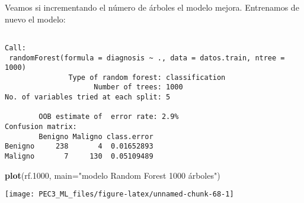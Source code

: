\documentclass[
]{article}
\newenvironment{Shaded}{\begin{snugshade}}{\end{snugshade}}
\newcommand{\DataTypeTok}[1]{\textcolor[rgb]{0.13,0.29,0.53}{#1}}
\newcommand{\DecValTok}[1]{\textcolor[rgb]{0.00,0.00,0.81}{#1}}
\newcommand{\FloatTok}[1]{\textcolor[rgb]{0.00,0.00,0.81}{#1}}
\newcommand{\KeywordTok}[1]{\textcolor[rgb]{0.13,0.29,0.53}{\textbf{#1}}}
\newcommand{\NormalTok}[1]{#1}
\newcommand{\OperatorTok}[1]{\textcolor[rgb]{0.81,0.36,0.00}{\textbf{#1}}}
\newcommand{\StringTok}[1]{\textcolor[rgb]{0.31,0.60,0.02}{#1}}
\begin{document}
Veamos si incrementando el número de árboles el modelo mejora.
Entrenamos de nuevo el modelo:

\begin{Shaded}
\end{Shaded}

\begin{verbatim}

Call:
 randomForest(formula = diagnosis ~ ., data = datos.train, ntree = 1000) 
               Type of random forest: classification
                     Number of trees: 1000
No. of variables tried at each split: 5

        OOB estimate of  error rate: 2.9%
Confusion matrix:
        Benigno Maligno class.error
Benigno     238       4  0.01652893
Maligno       7     130  0.05109489
\end{verbatim}

\begin{Shaded}
\begin{Highlighting}[]
\KeywordTok{plot}\NormalTok{(rf}\FloatTok{.1000}\NormalTok{, }\DataTypeTok{main=}\StringTok{"modelo Random Forest 1000 árboles"}\NormalTok{)}
\end{Highlighting}
\end{Shaded}

\begin{center}\texttt{[image: PEC3\_ML\_files/figure-latex/unnamed-chunk-68-1]} \end{center}

\begin{Shaded}
\end{Shaded}
\end{document}

